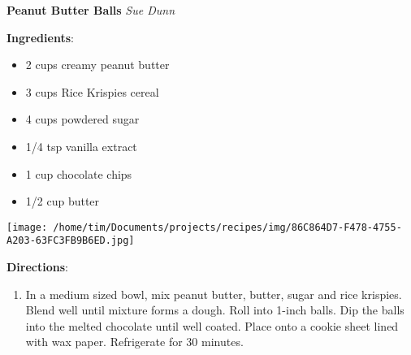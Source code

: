 \documentclass[11pt, twoside, openany]{book}
\begin{document}
\noindent\begin{minipage}[t]{\linewidth}%
{\Large\textbf{Peanut Butter Balls}} \label{peanut-butter-balls}\hfill\textit{Sue Dunn}\\
\noindent\begin{minipage}[t]{0.78\linewidth}%
\textbf{Ingredients}:\vspace{-3mm}
\begin{multicols}{2}
\begin{itemize}\setlength\itemsep{-1mm}
\item 2 cups creamy peanut butter
\item 3 cups Rice Krispies cereal
\item 4 cups powdered sugar
\item 1/4 tsp vanilla extract
\item 1 cup chocolate chips
\item 1/2 cup butter
\end{itemize}
\end{multicols}
\end{minipage}
\noindent\begin{minipage}[t]{0.18\linewidth}
\centering \strut\vspace*{-\baselineskip}\newline
\texttt{[image: /home/tim/Documents/projects/recipes/img/86C864D7-F478-4755-A203-63FC3FB9B6ED.jpg]}\\
\end{minipage}\vspace{3mm}
\textbf{Directions}:
\vspace{-3mm}\begin{enumerate}\setlength\itemsep{-1mm}
\item In a medium sized bowl, mix peanut butter, butter, sugar and rice krispies. Blend well until mixture forms a dough. Roll into 1-inch balls. Dip the balls into the melted chocolate until well coated. Place onto a cookie sheet lined with wax paper. Refrigerate for 30 minutes.
\end{enumerate}
\end{minipage}\vspace{8mm}
\end{document}
